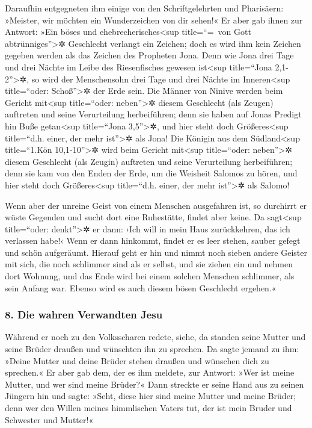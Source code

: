  Daraufhin entgegneten ihm einige von den
Schriftgelehrten und Pharisäern: »Meister, wir möchten ein Wunderzeichen
von dir sehen!«  Er aber gab ihnen zur Antwort: »Ein
böses und ehebrecherisches\textless sup title=``=~von Gott
abtrünniges''\textgreater✲ Geschlecht verlangt ein Zeichen; doch es wird
ihm kein Zeichen gegeben werden als das Zeichen des Propheten Jona.
 Denn wie Jona drei Tage und drei Nächte im Leibe des
Riesenfisches gewesen ist\textless sup title=``Jona
2,1-2''\textgreater✲, so wird der Menschensohn drei Tage und drei Nächte
im Inneren\textless sup title=``oder: Schoß''\textgreater✲ der Erde
sein.  Die Männer von Ninive werden beim Gericht
mit\textless sup title=``oder: neben''\textgreater✲ diesem Geschlecht
(als Zeugen) auftreten und seine Verurteilung herbeiführen; denn sie
haben auf Jonas Predigt hin Buße getan\textless sup title=``Jona
3,5''\textgreater✲, und hier steht doch Größeres\textless sup
title=``d.h. einer, der mehr ist''\textgreater✲ als Jona!
 Die Königin aus dem Südland\textless sup title=``1.Kön
10,1-10''\textgreater✲ wird beim Gericht mit\textless sup title=``oder:
neben''\textgreater✲ diesem Geschlecht (als Zeugin) auftreten und seine
Verurteilung herbeiführen; denn sie kam von den Enden der Erde, um die
Weisheit Salomos zu hören, und hier steht doch Größeres\textless sup
title=``d.h. einer, der mehr ist''\textgreater✲ als Salomo!

 Wenn aber der unreine Geist von einem Menschen
ausgefahren ist, so durchirrt er wüste Gegenden und sucht dort eine
Ruhestätte, findet aber keine.  Da sagt\textless sup
title=``oder: denkt''\textgreater✲ er dann: ›Ich will in mein Haus
zurückkehren, das ich verlassen habe!‹ Wenn er dann hinkommt, findet er
es leer stehen, sauber gefegt und schön aufgeräumt. 
Hierauf geht er hin und nimmt noch sieben andere Geister mit sich, die
noch schlimmer sind als er selbst, und sie ziehen ein und nehmen dort
Wohnung, und das Ende wird bei einem solchen Menschen schlimmer, als
sein Anfang war. Ebenso wird es auch diesem bösen Geschlecht ergehen.«

\hypertarget{die-wahren-verwandten-jesu}{%
\subsubsection{8. Die wahren Verwandten
Jesu}\label{die-wahren-verwandten-jesu}}

 Während er noch zu den Volksscharen redete, siehe, da
standen seine Mutter und seine Brüder draußen und wünschten ihn zu
sprechen.  Da sagte jemand zu ihm: »Deine Mutter und
deine Brüder stehen draußen und wünschen dich zu sprechen.«
 Er aber gab dem, der es ihm meldete, zur Antwort: »Wer
ist meine Mutter, und wer sind meine Brüder?«  Dann
streckte er seine Hand aus zu seinen Jüngern hin und sagte: »Seht, diese
hier sind meine Mutter und meine Brüder;  denn wer den
Willen meines himmlischen Vaters tut, der ist mein Bruder und Schwester
und Mutter!«

